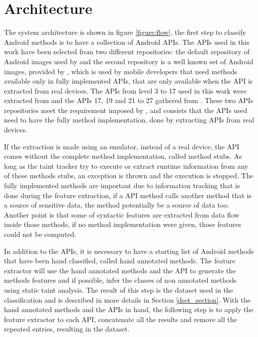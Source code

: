 \chapter{Architecture}

The system architecture is shown in figure \ref{figure:flow}, the first step to classify Android methods is to have a collection of Android APIs. The APIs used in this work have been selected from two different repositories: the default repository of Android images used by \cite{rasthofer2014machine} and the second repository is a well known set of Android images, provided by \cite{hiddenapi}, which is used by mobile developers that need methods available only in fully implemented APIs, that are only available when the API is extracted from real devices. The APIs from level 3 to 17 used in this work were extracted from \cite{rasthofer2014api} and the APIs 17, 19 and 21 to 27 gathered from \cite{hiddenapi}. These two APIs repositories meet the requirement imposed by \cite{rasthofer2014machine}, and consists that the APIs used need to have the fully method implementation, done by extracting APIs from real devices.

If the extraction is made using an emulator, instead of a real device, the API comes without the complete method implementation, called method stubs. As long as the taint tracker try to execute or extract runtime information from any of these methods stubs, an exception is thrown and the execution is stopped. The fully implemented methods are important due to information tracking that is done during the feature extraction, if a API method calls another method that is a source of sensitive data, the method potentially be a source of data too. Another point is that some of syntactic features are extracted from data flow inside those methods, if no method implementation were given, those features could not be computed.

In addition to the APIs, it is necessary to have a starting list of Android methods that have been hand classified, called hand annotated methods.  The feature extractor will use the hand annotated methods and the API to generate the methods features and if possible, infer the classes of non annotated methods using static taint analysis. The result of this step is the dataset used in the classification and is described in more details in Section \ref{dset_section}. With the hand annotated methods and the APIs in hand, the following step is to apply the feature extractor to each API, concatenate all the results and remove all the repeated entries, resulting in the dataset.

